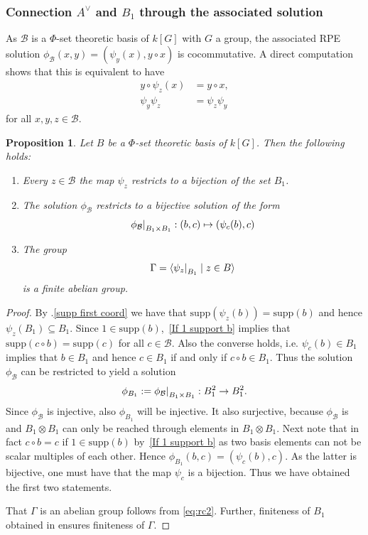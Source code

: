 \documentclass[a4paper,10pt]{amsart}
\newtheorem{proposition}[lemma]{Proposition}
\theoremstyle{definition}
\theoremstyle{remark}
\newcommand{\Supp}{\mathrm{supp}}
\newcommand\ot{\otimes}
\newcommand\mc{\mathcal}
\newcommand\restr[2]{{%
   \left.\kern-\nulldelimiterspace %
   #1 %
   \right|_{#2} %
   }}
\begin{document}
\subsubsection{Connection $A^{\vee}$ and $B_1$ through the associated solution}

As $\mc{B}$ is a $\Phi$-set theoretic basis of $k[G]$ with $G$ a group, the associated RPE solution $\phi_{\mc{B}}(x,y) = (\psi_{y}(x),  y\circ x)$ is cocommutative. A direct computation shows that this is equivalent to have
\begin{align}
y\circ \psi_z(x) &= y\circ x,\label{eq:rc1}\\
    \psi_y\psi_z&=\psi_z\psi_y \label{eq:rc2}
\end{align}
for all $x,y,z\in \mc{B}$. 


\begin{proposition}\label{construction Gamma}
Let $B$ be a $\Phi$-set theoretic basis of $k[G]$. Then the following holds:
\begin{enumerate}
    \item Every $z \in \mc{B}$ the map $\psi_z$ restricts to a bijection of the set $B_1$.
    \item The solution $\phi_{\mc{B}}$ restricts to a bijective solution of the form
    $$\restr{\phi_{\mc{B}}}{B_1 \times B_1}: (b,c) \mapsto (\psi_c(b),c)$$
    \item The group 
    $$\Gamma=\langle \restr{\psi_z}{B_1} \mid z\in  B\rangle$$
    is a finite abelian group.
\end{enumerate}
\end{proposition}
\begin{proof}
    By .\eqref{supp first coord}  we have that $\Supp(\psi_z(b)) = \Supp (b)$ and hence $\psi_z(B_1) \subseteq B_1$.  Since $1\in\Supp(b)$, \,\eqref{If 1 support b} implies that $\Supp(c\circ b)=\Supp(c)$ for all $c\in \mc{B}$. Also the converse holds, i.e. $\psi_c(b) \in B_1$ implies that $b \in B_1$ and hence $c \in B_1$ if and only if $c\circ b \in B_1$.
 Thus the solution $\phi_{\mc{B}}$ can be restricted to yield a solution 
$$\phi_{B_1}:=\restr{\phi_{\mc{B}}}{B_1 \times B_1}: B_1^2 \rightarrow B_1^2.$$
Since $\phi_{\mc{B}}$ is injective, also $\phi_{B_1}$ will be injective. It also surjective, because $\phi_{\mc{B}}$  is and $B_1 \otimes B_1$ can only be reached through elements in $B_1 \ot B_1$. Next note that in fact $c \circ b =c$ if $1 \in \Supp(b)$ by \,\eqref{If 1 support b} as two basis elements can not be scalar multiples of each other. Hence $\phi_{B_1}(b,c) = (\psi_c(b), c)$. As the latter is bijective, one must have that the map $\psi_c$ is a bijection. Thus we have obtained the first two statements. 
    
That $\Gamma$ is an abelian group follows from \eqref{eq:rc2}. Further, finiteness of $B_1$ obtained in  ensures finiteness of $\Gamma$.
\end{proof}
\end{document}
